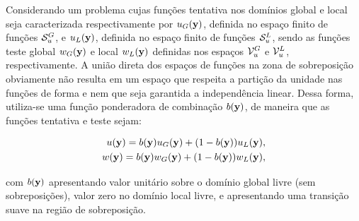 \begin{figure}[!htbp]
	\label{fig:domains}
\end{figure}

Considerando um problema cujas funções tentativa nos domínios global e local seja caracterizada respectivamente por $u_{G}(\mathbf{y})$, definida no espaço finito de funções $\mathcal{S}_u^{G}$, e  $u_{L}(\mathbf{y})$, definida no espaço finito de funções $\mathcal{S}_u^{L}$, sendo as funções teste global $w_{G}(\mathbf{y})$ e local $w_{L}(\mathbf{y})$ definidas nos espaços $\mathcal{V}_u^{G}$ e $\mathcal{V}_u^{L}$, respectivamente. A união direta dos espaços de funções na zona de sobreposição obviamente não resulta em um espaço que respeita a partição da unidade nas funções de forma e nem que seja garantida a independência linear. 
Dessa forma, utiliza-se uma função ponderadora de combinação $b(\mathbf{y})$, de maneira que as funções tentativa e teste sejam:

\begin{align}
u(\mathbf{y}) = b(\mathbf{y})u_{G}(\mathbf{y}) + (1-b(\mathbf{y}))u_{L}(\mathbf{y}),\\
w(\mathbf{y}) = b(\mathbf{y})w_{G}(\mathbf{y}) + (1-b(\mathbf{y}))w_{L}(\mathbf{y}),
\end{align}

\noindent com $b(\mathbf{y})$ apresentando valor unitário sobre o domínio global livre (sem sobreposições), valor zero no domínio local livre, e apresentando uma transição suave na região de sobreposição. 

